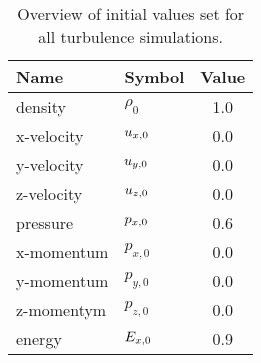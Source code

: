 \begin{table}[H]
\caption{Overview of initial values set for all turbulence simulations.}
\centering
\begin{tabular}{llc}
\toprule
Name & Symbol & Value \\
\midrule
density         & $\rho_0$            & 1.0 \\
x-velocity      & $u_{x,0}$       & 0.0 \\
y-velocity      & $u_{y,0}$       & 0.0 \\
z-velocity      & $u_{z,0}$       & 0.0 \\ 
pressure        & $p_{x,0}$       & 0.6 \\ 
x-momentum      & $p_{x,0}$           & 0.0 \\
y-momentum      & $p_{y,0}$           & 0.0 \\
z-momentym      & $p_{z,0}$           & 0.0 \\ 
energy          & $E_{x,0}$       & 0.9 \\
\bottomrule
\end{tabular}
\label{tab:initial-state}
\end{table}
